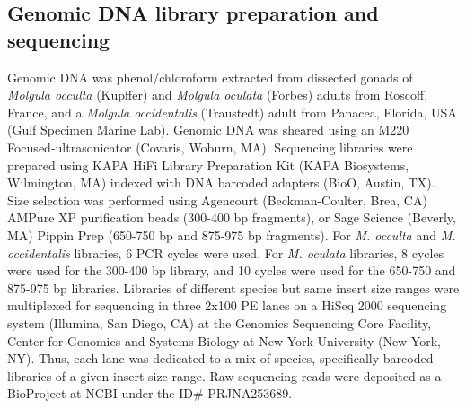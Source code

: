 \subsection{Genomic DNA library preparation and sequencing}
Genomic DNA was phenol/chloroform extracted from dissected gonads of \textit{Molgula occulta} (Kupffer) and \textit{Molgula oculata} (Forbes) adults from Roscoff, France, and a \textit{Molgula occidentalis} (Traustedt) adult from Panacea, Florida, USA (Gulf Specimen Marine Lab). Genomic DNA was sheared using an M220 Focused-ultrasonicator (Covaris, Woburn, MA). Sequencing libraries were prepared using KAPA HiFi Library Preparation Kit (KAPA Biosystems, Wilmington, MA) indexed with DNA barcoded adapters (BioO, Austin, TX). Size selection was performed using Agencourt (Beckman-Coulter, Brea, CA) AMPure XP purification beads (300-400 bp fragments), or Sage Science (Beverly, MA) Pippin Prep (650-750 bp and 875-975 bp fragments). For \textit{M. occulta} and \textit{M. occidentalis} libraries, 6 PCR cycles were used. For \textit{M. oculata} libraries, 8 cycles were used for the 300-400 bp library, and 10 cycles were used for the 650-750 and 875-975 bp libraries. Libraries of different species but same insert size ranges were multiplexed for sequencing in three 2x100 PE lanes on a HiSeq 2000 sequencing system (Illumina, San Diego, CA) at the Genomics Sequencing Core Facility, Center for Genomics and Systems Biology at New York University (New York, NY). Thus, each lane was dedicated to a mix of species, specifically barcoded libraries of a given insert size range. Raw sequencing reads were deposited as a BioProject at NCBI under the ID\# PRJNA253689.
